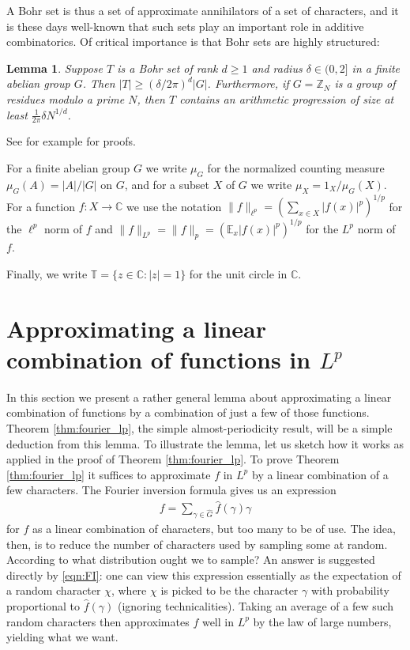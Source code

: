 \documentclass[12pt,a4paper,reqno]{amsart}
\numberwithin{equation}{section}
\theoremstyle{plain}
\newtheorem{lemma}[subsection]{Lemma}
\theoremstyle{definition}
\renewcommand{\geq}{\geqslant}
\def\E{\mathbb{E}}
\def\Z{\mathbb{Z}}
\def\T{\mathbb{T}}
\def\C{\mathbb{C}}
\def\Ghat{\widehat{G}}
\def\fhat{\widehat{f}}
\newcommand{\Zmod}[1]{\Z_{#1}} %
\providecommand{\abs}[1]{\lvert#1\rvert}
\providecommand{\norm}[1]{\lVert #1 \rVert}
\theoremstyle{plain}
\begin{document}
A Bohr set is thus a set of approximate annihilators of a set of characters, and it is these days well-known that such sets play an important role in additive combinatorics. Of critical importance is that Bohr sets are highly structured:

\begin{lemma}\label{lemma:bohr_sets}
Suppose $T$ is a Bohr set of rank $d \geq 1$ and radius $\delta \in (0,2]$ in a finite abelian group $G$. Then $\abs{T} \geq (\delta/2\pi)^d \abs{G}$. Furthermore, if $G = \Zmod{N}$ is a group of residues modulo a prime $N$, then $T$ contains an arithmetic progression of size at least $\frac{1}{2\pi}\delta N^{1/d}$.
\end{lemma}

See for example \cite[\S4.4]{tao-vu} for proofs.

For a finite abelian group $G$ we write $\mu_G$ for the normalized counting measure $\mu_G(A) = \abs{A}/\abs{G}$ on $G$, and for a subset $X$ of $G$ we write $\mu_X = 1_X/\mu_G(X)$. For a function $f : X \to \C$ we use the notation $\norm{f}_{\ell^p} = (\sum_{x \in X} \abs{f(x)}^p)^{1/p}$ for the $\ell^p$ norm of $f$ and $\norm{f}_{L^p} = \norm{f}_p = (\E_x \abs{f(x)}^p)^{1/p}$ for the $L^p$ norm of $f$. 

Finally, we write $\T = \{ z \in \C : \abs{z} = 1 \}$ for the unit circle in $\C$.

\section{Approximating a linear combination of functions in $L^p$}\label{section:prob_arg}
In this section we present a rather general lemma about approximating a linear combination of functions by a combination of just a few of those functions. Theorem \ref{thm:fourier_lp}, the simple almost-periodicity result, will be a simple deduction from this lemma. To illustrate the lemma, let us sketch how it works as applied in the proof of Theorem \ref{thm:fourier_lp}. To prove Theorem \ref{thm:fourier_lp} it suffices to approximate $f$ in $L^p$ by a linear combination of a few characters. The Fourier inversion formula gives us an expression
\begin{align} f = \sum_{\gamma \in \Ghat} \fhat(\gamma) \gamma \label{eqn:FI} \end{align}
for $f$ as a linear combination of characters, but too many to be of use. The idea, then, is to reduce the number of characters used by sampling some at random. According to what distribution ought we to sample? An answer is suggested directly by \eqref{eqn:FI}: one can view this expression essentially as the expectation of a random character $\chi$, where $\chi$ is picked to be the character $\gamma$ with probability proportional to $\fhat(\gamma)$ (ignoring technicalities). Taking an average of a few such random characters then approximates $f$ well in $L^p$ by the law of large numbers, yielding what we want.
\end{document}
